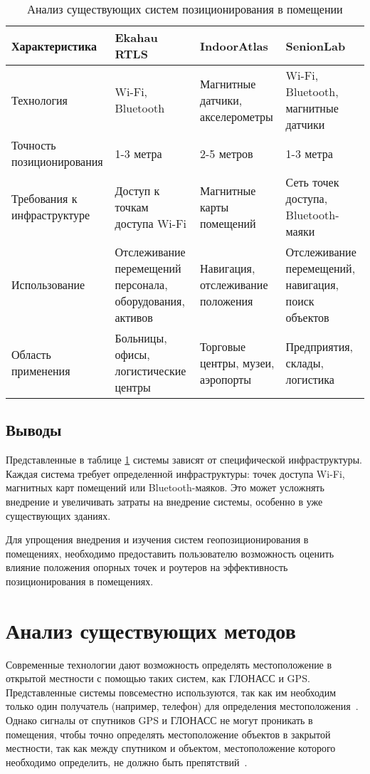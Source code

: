 \begin{table}[H]
    \caption{Анализ существующих систем позиционирования в помещении}
    \label{tab:es}
    \centering
    \begin{tabular}{|m{7 em}|m{8em}|m{8em}|m{8em}|}
        \hline
        Характеристика & Ekahau RTLS & IndoorAtlas & SenionLab \\
        \hline
        Технология & Wi-Fi, Bluetooth & Магнитные датчики, акселерометры & Wi-Fi, Bluetooth, магнитные датчики \\
        \hline
        Точность позиционирования & 1-3 метра & 2-5 метров & 1-3 метра \\
        \hline
        Требования к инфраструктуре & Доступ к точкам доступа Wi-Fi & Магнитные карты помещений & Сеть точек доступа, Bluetooth-маяки \\
        \hline
        Использование & Отслеживание перемещений персонала, оборудования, активов & Навигация, отслеживание положения & Отслеживание перемещений, навигация, поиск объектов \\
        \hline
        Область применения & Больницы, офисы, логистические центры & Торговые центры, музеи, аэропорты & Предприятия, склады, логистика \\
        \hline
      \end{tabular}
\end{table}

\subsection{Выводы}

Представленные в таблице \ref{tab:es} системы зависят от специфической инфраструктуры. Каждая система требует определенной инфраструктуры: точек доступа Wi-Fi, магнитных карт помещений или Bluetooth-маяков. Это может усложнять внедрение и увеличивать затраты на внедрение системы, особенно в уже существующих зданиях.

Для упрощения внедрения и изучения систем геопозиционирования в помещениях, необходимо предоставить пользователю возможность оценить влияние положения опорных точек и роутеров на эффективность позиционирования в помещениях.

\clearpage

\section{Анализ существующих методов}

Современные технологии дают возможность определять местоположение в открытой местности с помощью таких систем, как ГЛОНАСС и GPS. Представленные системы повсеместно используются, так как им необходим только один получатель (например, телефон) для определения местоположения~\cite{trends}. Однако сигналы от спутников GPS и ГЛОНАСС не могут проникать в помещения, чтобы точно определять местоположение объектов в закрытой местности, так как между спутником и объектом, местоположение которого необходимо определить, не должно быть препятствий~\cite{IGS}. 

